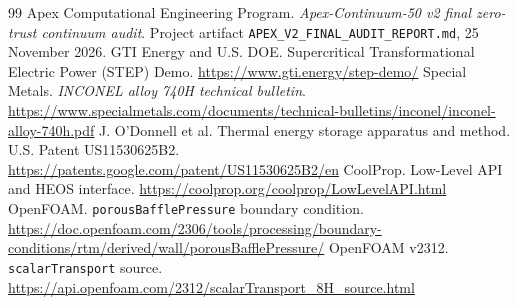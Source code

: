 \documentclass[10pt,a4paper]{article}
\begin{document}

\begin{thebibliography}{99}\small
  \setlength{\itemsep}{2pt}
   Apex Computational Engineering Program. \textit{Apex-Continuum-50 v2 final zero-trust continuum audit}. Project artifact \texttt{APEX\_V2\_FINAL\_AUDIT\_REPORT.md}, 25 November 2026.
   GTI Energy and U.S. DOE. Supercritical Transformational Electric Power (STEP) Demo. \url{https://www.gti.energy/step-demo/}
   Special Metals. \textit{INCONEL alloy 740H technical bulletin}. \url{https://www.specialmetals.com/documents/technical-bulletins/inconel/inconel-alloy-740h.pdf}
   J. O'Donnell et al. Thermal energy storage apparatus and method. U.S. Patent US11530625B2. \url{https://patents.google.com/patent/US11530625B2/en}
   CoolProp. Low-Level API and HEOS interface. \url{https://coolprop.org/coolprop/LowLevelAPI.html}
   OpenFOAM. \texttt{porousBafflePressure} boundary condition. \url{https://doc.openfoam.com/2306/tools/processing/boundary-conditions/rtm/derived/wall/porousBafflePressure/}
   OpenFOAM v2312. \texttt{scalarTransport} source. \url{https://api.openfoam.com/2312/scalarTransport_8H_source.html}
\end{thebibliography}
\end{document}
